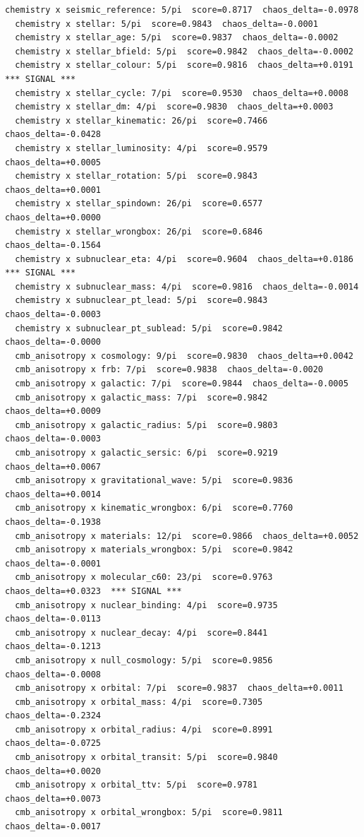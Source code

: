 \documentclass[11pt, letterpaper, openany]{book}
\begin{document}
\begin{empiricalbox}
\begin{lstlisting}[style=terminal]
  chemistry x seismic_reference: 5/pi  score=0.8717  chaos_delta=-0.0978
  chemistry x stellar: 5/pi  score=0.9843  chaos_delta=-0.0001
  chemistry x stellar_age: 5/pi  score=0.9837  chaos_delta=-0.0002
  chemistry x stellar_bfield: 5/pi  score=0.9842  chaos_delta=-0.0002
  chemistry x stellar_colour: 5/pi  score=0.9816  chaos_delta=+0.0191  *** SIGNAL ***
  chemistry x stellar_cycle: 7/pi  score=0.9530  chaos_delta=+0.0008
  chemistry x stellar_dm: 4/pi  score=0.9830  chaos_delta=+0.0003
  chemistry x stellar_kinematic: 26/pi  score=0.7466  chaos_delta=-0.0428
  chemistry x stellar_luminosity: 4/pi  score=0.9579  chaos_delta=+0.0005
  chemistry x stellar_rotation: 5/pi  score=0.9843  chaos_delta=+0.0001
  chemistry x stellar_spindown: 26/pi  score=0.6577  chaos_delta=+0.0000
  chemistry x stellar_wrongbox: 26/pi  score=0.6846  chaos_delta=-0.1564
  chemistry x subnuclear_eta: 4/pi  score=0.9604  chaos_delta=+0.0186  *** SIGNAL ***
  chemistry x subnuclear_mass: 4/pi  score=0.9816  chaos_delta=-0.0014
  chemistry x subnuclear_pt_lead: 5/pi  score=0.9843  chaos_delta=-0.0003
  chemistry x subnuclear_pt_sublead: 5/pi  score=0.9842  chaos_delta=-0.0000
  cmb_anisotropy x cosmology: 9/pi  score=0.9830  chaos_delta=+0.0042
  cmb_anisotropy x frb: 7/pi  score=0.9838  chaos_delta=-0.0020
  cmb_anisotropy x galactic: 7/pi  score=0.9844  chaos_delta=-0.0005
  cmb_anisotropy x galactic_mass: 7/pi  score=0.9842  chaos_delta=+0.0009
  cmb_anisotropy x galactic_radius: 5/pi  score=0.9803  chaos_delta=-0.0003
  cmb_anisotropy x galactic_sersic: 6/pi  score=0.9219  chaos_delta=+0.0067
  cmb_anisotropy x gravitational_wave: 5/pi  score=0.9836  chaos_delta=+0.0014
  cmb_anisotropy x kinematic_wrongbox: 6/pi  score=0.7760  chaos_delta=-0.1938
  cmb_anisotropy x materials: 12/pi  score=0.9866  chaos_delta=+0.0052
  cmb_anisotropy x materials_wrongbox: 5/pi  score=0.9842  chaos_delta=-0.0001
  cmb_anisotropy x molecular_c60: 23/pi  score=0.9763  chaos_delta=+0.0323  *** SIGNAL ***
  cmb_anisotropy x nuclear_binding: 4/pi  score=0.9735  chaos_delta=-0.0113
  cmb_anisotropy x nuclear_decay: 4/pi  score=0.8441  chaos_delta=-0.1213
  cmb_anisotropy x null_cosmology: 5/pi  score=0.9856  chaos_delta=-0.0008
  cmb_anisotropy x orbital: 7/pi  score=0.9837  chaos_delta=+0.0011
  cmb_anisotropy x orbital_mass: 4/pi  score=0.7305  chaos_delta=-0.2324
  cmb_anisotropy x orbital_radius: 4/pi  score=0.8991  chaos_delta=-0.0725
  cmb_anisotropy x orbital_transit: 5/pi  score=0.9840  chaos_delta=+0.0020
  cmb_anisotropy x orbital_ttv: 5/pi  score=0.9781  chaos_delta=+0.0073
  cmb_anisotropy x orbital_wrongbox: 5/pi  score=0.9811  chaos_delta=-0.0017

\end{lstlisting}
\end{empiricalbox}
\end{document}

